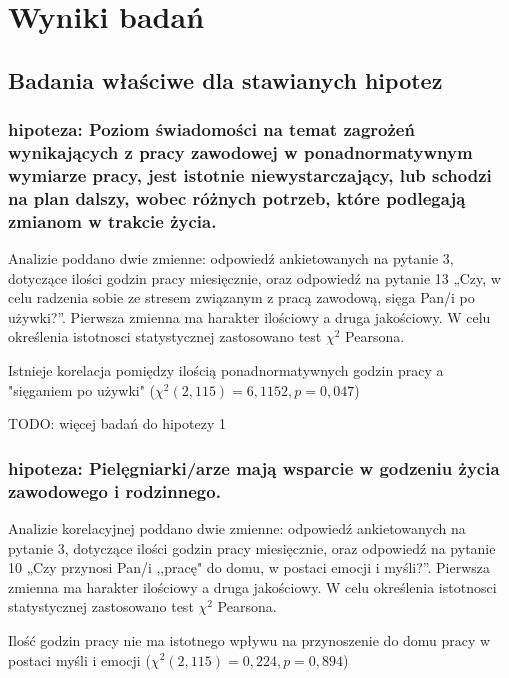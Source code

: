\documentclass[a4paper,12pt,twoside,openany]{report}
\begin{document}
\chapter{Wyniki badań}


\section*{Badania właściwe dla stawianych hipotez}


\subsection*{hipoteza: Poziom świadomości na temat zagrożeń wynikających z pracy zawodowej w ponadnormatywnym wymiarze pracy,  jest  istotnie niewystarczający, lub schodzi na plan dalszy, wobec różnych potrzeb, które podlegają zmianom w trakcie życia.}


Analizie poddano dwie zmienne: odpowiedź ankietowanych na pytanie 3, dotyczące ilości godzin pracy miesięcznie, oraz odpowiedź na pytanie 13 „Czy, w celu radzenia sobie ze stresem związanym z pracą zawodową, sięga Pan/i po używki?”. Pierwsza zmienna ma harakter ilościowy a druga jakościowy. W celu określenia istotnosci statystycznej zastosowano test $\chi^2$ Pearsona. 

Istnieje korelacja pomiędzy ilością ponadnormatywnych godzin pracy a "sięganiem po używki" ($\chi^2 (2, 115) = 6,1152, p=0,047$)
   
\vspace{\baselineskip} 

TODO: więcej badań do hipotezy 1

\vspace{\baselineskip} 

\subsection*{hipoteza: Pielęgniarki/arze mają wsparcie w godzeniu życia zawodowego i rodzinnego.}


Analizie korelacyjnej poddano dwie zmienne: odpowiedź ankietowanych na pytanie 3, dotyczące ilości godzin pracy miesięcznie, oraz odpowiedź na pytanie 10 „Czy przynosi Pan/i ,,pracę" do domu, w postaci emocji i myśli?”. Pierwsza zmienna ma harakter ilościowy a druga jakościowy. W celu określenia istotnosci statystycznej zastosowano test $\chi^2$ Pearsona.

    Ilość godzin pracy nie ma istotnego wpływu na przynoszenie do domu pracy w postaci myśli i emocji ($\chi^2 (2, 115) = 0,224, p=0,894$)
    
\end{document}
